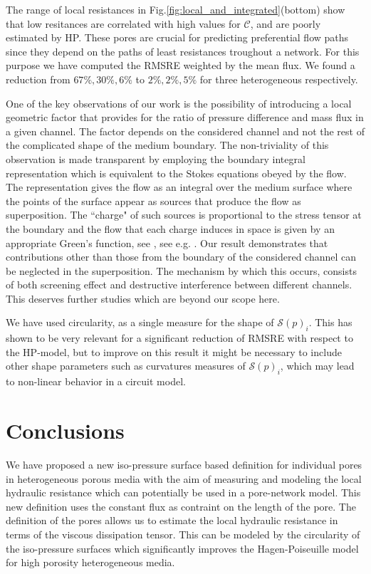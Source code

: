 \documentclass[draft]{agujournal2019}
\begin{document}
The range of local resistances in Fig.\ref{fig:local_and_integrated}(bottom) show that low resitances are correlated with high values for $\mathcal{C}$, and are poorly estimated by HP. These pores are crucial for predicting preferential flow paths since they depend on the paths of least resistances troughout a network. For this purpose we have computed the RMSRE weighted by the mean flux. We found a reduction from $67\%, 30\%, 6\%$ to $2\%, 2\%,5\%$ for three heterogeneous respectively.  

One of the key observations of our work is the possibility of introducing a local geometric factor that provides for the ratio of pressure difference and mass flux in a given channel. The factor depends on the considered channel and not the rest of the complicated shape of the medium boundary. The non-triviality of this observation is made transparent by employing the boundary integral representation which is equivalent to the Stokes equations obeyed by the flow. The representation gives the flow as an integral over the medium surface where the points of the surface appear as sources that produce the flow as superposition. The ``charge" of such sources is proportional to the stress tensor at the boundary and the flow that each charge induces in space is given by an appropriate Green's function, see , see e.g. \cite{pozrikidis_boundary_1992}. Our result demonstrates that contributions other than those from the boundary of the considered channel can be neglected in the superposition. The mechanism by which this occurs, consists of both screening effect and destructive interference between different channels. This deserves further studies which are beyond our scope here.

We have used circularity, as a single measure for the shape of $\mathcal{S}(p)_i$. This has shown to be very relevant for a significant reduction of RMSRE with respect to the HP-model, but to improve on this result it might be necessary to include other shape parameters such as curvatures measures of $\mathcal{S}(p)_i$, which may lead to non-linear behavior in a circuit model.  

\section{Conclusions}
We have proposed a new iso-pressure surface based definition for individual pores in heterogeneous porous media with the aim of measuring and modeling the local hydraulic resistance which can potentially be used in a pore-network model. This new definition uses the constant flux as contraint on the length of the pore. The definition of the pores allows us to estimate the local hydraulic resistance in terms of the viscous dissipation tensor. This can be modeled by the circularity of the iso-pressure surfaces which significantly improves the Hagen-Poiseuille model for high porosity heterogeneous media. 









\end{document}
